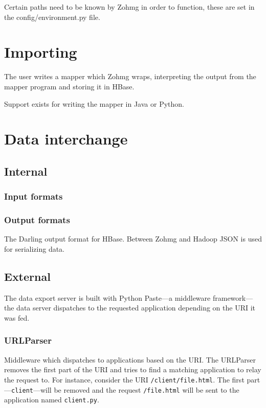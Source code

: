\documentclass[a4paper,10pt]{book}
\begin{document}
Certain paths need to be known by Zohmg in order to function, these are set
in the config/environment.py file.



\section{Importing}

The user writes a mapper which Zohmg wraps, interpreting the output from
the mapper program and storing it in HBase.

Support exists for writing the mapper in Java or Python.



\section{Data interchange}

\subsection{Internal}

\subsubsection{Input formats}

\subsubsection{Output formats}

The Darling output format for HBase. Between Zohmg and Hadoop JSON is used
for serializing data.


\subsection{External}

The data export server is built with Python Paste---a middleware
framework---the data server dispatches to the requested application
depending on the URI it was fed.


\subsubsection{URLParser}

Middleware which dispatches to applications based on the URI. The URLParser
removes the first part of the URI and tries to find a matching application
to relay the request to. For instance, consider the URI
\texttt{/client/file.html}. The first part---\texttt{client}---will be
removed and the request \texttt{/file.html} will be sent to the application
named \texttt{client.py}.
\end{document}
